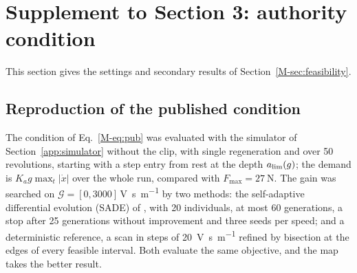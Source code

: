 \section{Supplement to Section 3: authority condition}\label{supp:feas}

This section gives the settings and secondary results of Section~\ref{M-sec:feasibility}.

\subsection{Reproduction of the published condition}\label{supp:feas-pub}

The condition of Eq.~\eqref{M-eq:pub} was evaluated with the simulator of Section~\ref{app:simulator} without the clip, with single regeneration and over 50 revolutions, starting with a step entry from rest at the depth $a_{\lim}(g)$; the demand is $K_ag\max_t\lvert\dot x\rvert$ over the whole run, compared with $F_{\max}=\SI{27}{\newton}$. The gain was searched on $\mathcal G=[0,3000]$\,\si{\volt\second\per\metre} by two methods: the self-adaptive differential evolution (SADE) of \citet{qin2009sade}, with 20 individuals, at most 60 generations, a stop after 25 generations without improvement and three seeds per speed; and a deterministic reference, a scan in steps of \SI{20}{\volt\second\per\metre} refined by bisection at the edges of every feasible interval. Both evaluate the same objective, and the map takes the better result.


